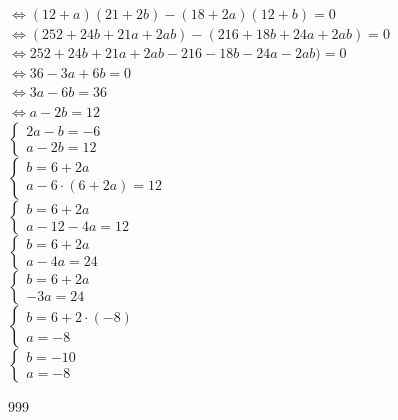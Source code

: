 \documentclass[a4paper]{article}
\begin{document}
$\Leftrightarrow (12+a)(21+2b)-(18+2a)(12+b)=0$\\

$\Leftrightarrow (252+24b+21a+2ab)-(216+18b+24a+2ab)=0$\\

$\Leftrightarrow 252+24b+21a+2ab-216-18b-24a-2ab)=0$\\

$\Leftrightarrow 36-3a+6b=0$\\

$\Leftrightarrow 3a-6b=36$\\

$\Leftrightarrow a-2b=12$\\



$\left\{
\begin{array}{l}
2a - b = -6 \\
a-2b=12
\end{array}
\right.$\\

$\left\{
\begin{array}{l}
b  =  6+2a \\
a - 6 \cdot(6+2a)  =  12
\end{array}
\right.$\\

$\left\{
\begin{array}{l}
b  =  6+2a \\
a -12-4a =  12
\end{array}
\right.$\\

$\left\{
\begin{array}{l}
b  =  6+2a \\
a -4a =  24
\end{array}
\right.$\\

$\left\{
\begin{array}{l}
b  =  6+2a \\
-3a =  24
\end{array}
\right.$\\

$\left\{
\begin{array}{l}
b = 6+2 \cdot (-8)  \\
a = -8
\end{array}
\right.$\\

$\left\{
\begin{array}{l}
b = -10  \\
a = -8
\end{array}
\right.$\\







\begin{thebibliography}{999}
\end{thebibliography}
\end{document}
